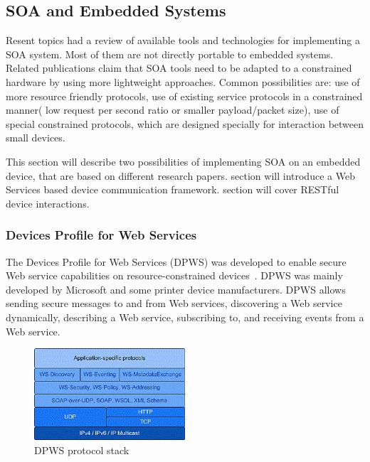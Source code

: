 \subsection{SOA and Embedded Systems}

Resent topics had a review of available tools and technologies for implementing a
\gls{SOA} system. Most of them are not directly portable to embedded systems.
Related publications \cite{5470528, dguinard-rest-vs-ws} claim that SOA
tools need to be adapted to a constrained hardware by using more lightweight approaches.
Common possibilities are: use of more resource friendly protocols, use of
existing service protocols in a constrained manner( low request per second
ratio or smaller payload/packet size), use of special constrained protocols,
which are designed specially for interaction between small devices.

This section will describe two possibilities of implementing SOA on an embedded
device, that are based on different research
papers\cite{coap_survey,4221180}.
 section will introduce a
Web Services based device communication framework.  section
will cover RESTful device interactions.
\subsubsection{Devices Profile for Web Services}
\label{sec:DPWS}
The Devices Profile for Web Services (DPWS) was developed to enable secure Web
service capabilities on resource-constrained devices~\cite{ws4d_dpws}.
DPWS was mainly developed by Microsoft and some printer device manufacturers.
DPWS allows sending secure messages to and from Web services, discovering a Web service dynamically, describing a Web service, subscribing to, and receiving events from a Web service.


\begin{center}
 \begin{figure}[h]
	\centering
	\includegraphics[width=0.5\textwidth]{../images/background/dpws-stack.png}
	\caption{DPWS protocol stack \cite{ws4d_dpws} }
	\label{fig:dpws_protocol_stack}
 \end{figure}
\end{center}


